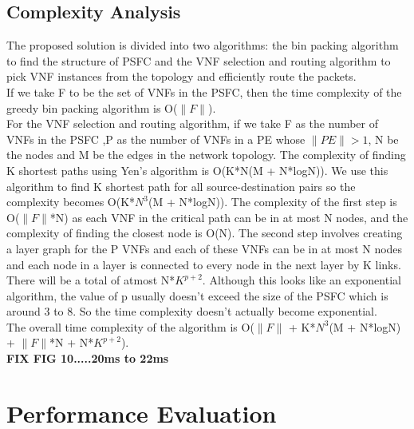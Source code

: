 \documentclass[journal]{IEEEtran}
\begin{document}
\subsection{Complexity Analysis}
The proposed solution is divided into two algorithms: the bin packing algorithm to find the structure of PSFC and the VNF selection and routing algorithm to pick VNF instances from the topology and efficiently route the packets.\\
If we take F to be the set of VNFs in the PSFC, then the time complexity of the greedy bin packing algorithm is O($\lVert F \rVert$).\\
For the VNF selection and routing algorithm, if we take F as the number of VNFs in the PSFC ,P as the number of VNFs in a PE whose $\lVert PE \rVert > 1$, N be the nodes and M be the edges in the network topology. The complexity of finding K shortest paths using Yen's algorithm is O(K*N(M + N*logN)). We use this algorithm to find K shortest path for all source-destination pairs so the complexity becomes O(K*$N^3$(M + N*logN)). The complexity of the first step is O($\lVert F \rVert$*N) as each VNF in the critical path can be in at most N nodes, and the complexity of finding the closest node is O(N). The second step involves creating a layer graph for the P VNFs and each of these VNFs can be in at most N nodes and each node in a layer is connected to every node in the next layer by K links. There will be a total of atmost N*$K^{p+2}$. Although this looks like an exponential algorithm, the value of p usually doesn't exceed the size of the PSFC which is around 3 to 8. So the time complexity doesn't actually become exponential.\\ The overall time complexity of the algorithm is O($\lVert F \rVert$ + K*$N^3$(M + N*logN) + $\lVert F \rVert$*N + N*$K^{p+2}$).\\
\textbf{FIX FIG 10.....20ms to 22ms}


\section{Performance Evaluation}
\end{document}
